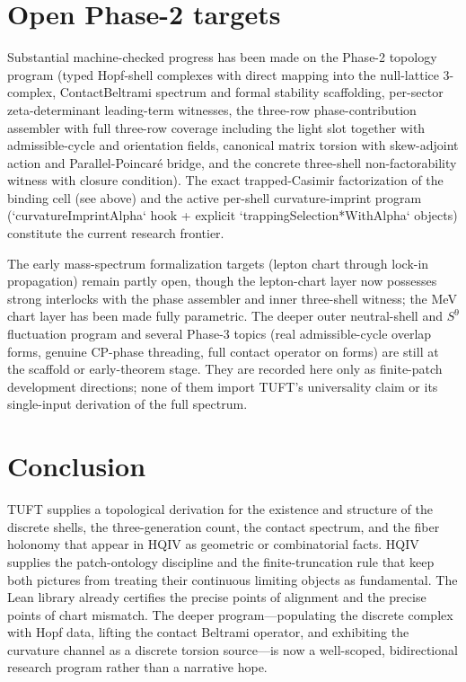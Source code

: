 \documentclass[11pt]{article}
\begin{document}
\section{Open Phase-2 targets}

Substantial machine-checked progress has been made on the Phase-2 topology
program (typed Hopf-shell complexes with direct mapping into the
null-lattice 3-complex, ContactBeltrami spectrum and formal stability
scaffolding, per-sector zeta-determinant leading-term witnesses, the
three-row phase-contribution assembler with full three-row coverage including the
light slot together with admissible-cycle and orientation fields, canonical
matrix torsion with skew-adjoint action and Parallel-Poincaré
bridge, and the concrete three-shell non-factorability witness with closure condition).
The exact trapped-Casimir factorization of the binding cell (see above)
and the active per-shell curvature-imprint program
(`curvatureImprintAlpha` hook + explicit `trappingSelection*WithAlpha`
objects) constitute the current research frontier.

The early mass-spectrum formalization targets (lepton chart through lock-in
propagation) remain partly open, though the lepton-chart layer now possesses
strong interlocks with the phase assembler and inner three-shell witness; the MeV chart layer has been made fully
parametric. The deeper outer neutral-shell and $S^9$ fluctuation program and several
Phase-3 topics (real admissible-cycle overlap forms, genuine CP-phase
threading, full contact operator on forms) are still at the scaffold or
early-theorem stage. They are recorded here only as finite-patch development
directions; none of them import TUFT's universality claim or its single-input
derivation of the full spectrum.

\section{Conclusion}

TUFT supplies a topological derivation for the existence and structure
of the discrete shells, the three-generation count, the contact spectrum,
and the fiber holonomy that appear in HQIV as geometric or combinatorial
facts. HQIV supplies the patch-ontology discipline and the finite-truncation
rule that keep both pictures from treating their continuous limiting
objects as fundamental. The Lean library already certifies the precise
points of alignment and the precise points of chart mismatch. The deeper
program---populating the discrete complex with Hopf data, lifting the
contact Beltrami operator, and exhibiting the curvature channel as a
discrete torsion source---is now a well-scoped, bidirectional research
program rather than a narrative hope.
\end{document}
